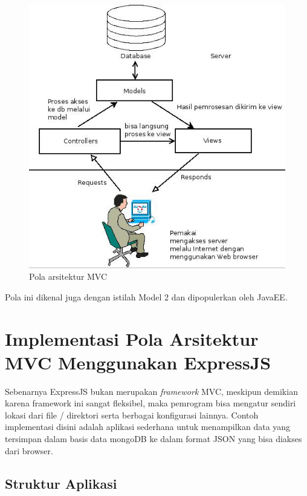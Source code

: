   \begin{figure}
    \begin{center}
      \includegraphics[scale=0.5]{images/mvc.jpg}
    \end{center}
    \caption{Pola arsitektur MVC}
    \label{fig:mvc}
  \end{figure}

Pola ini dikenal juga dengan istilah Model 2 dan dipopulerkan oleh JavaEE. 

\section{Implementasi Pola Arsitektur MVC Menggunakan ExpressJS}

Sebenarnya ExpressJS bukan merupakan \textit{framework} MVC, meskipun demikian karena framework ini sangat fleksibel, maka pemrogram bisa mengatur sendiri lokasi dari file / direktori serta berbagai konfigurasi lainnya. Contoh implementasi disini adalah aplikasi sederhana untuk menampilkan data yang tersimpan dalam basis data mongoDB ke dalam format JSON yang bisa diakses dari browser.

\subsection{Struktur Aplikasi}

